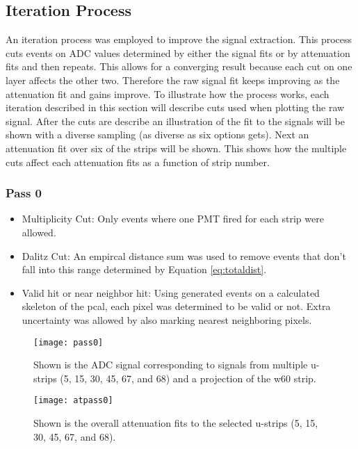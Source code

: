 \FloatBarrier
\subsection{Iteration Process}
An iteration process was employed to improve the signal extraction. This process cuts events on ADC values determined by either the signal fits or by attenuation fits and then repeats. This allows for a converging result because each cut on one layer affects the other two. Therefore the raw signal fit keeps improving as the attenuation fit and gains improve. To illustrate how the process works, each iteration described in this section will describe cuts used when plotting the raw signal. After the cuts are describe an illustration of the fit to the signals will be shown with a diverse sampling (as diverse as six options gets). Next an attenuation fit over six of the strips will be shown. This shows how the multiple cuts affect each attenuation fits as a function of strip number. 

\clearpage
\FloatBarrier
\subsubsection{Pass 0}
\begin{itemize}
    \item Multiplicity Cut: Only events where one PMT fired for each strip were allowed.
    \item Dalitz Cut: An empircal distance sum was used to remove events that don't fall into this range determined by Equation \ref{eq:totaldist}.
    \item Valid hit or near neighbor hit: Using generated events on a calculated skeleton of the pcal, each pixel was determined to be valid or not. Extra uncertainty was allowed by also marking nearest neighboring pixels.
\end{itemize}

\begin{figure}[h]
    \centering
    \texttt{[image: pass0]}
    \caption{Shown is the ADC signal corresponding to signals from multiple u-strips (5, 15, 30, 45, 67, and 68) and a projection of the w60 strip.}
    \label{fig:pass0}
\end{figure}

\begin{figure}[h]
    \centering
    \texttt{[image: atpass0]}
    \caption{Shown is the overall attenuation fits to the selected u-strips (5, 15, 30, 45, 67, and 68).}
    \label{fig:atpass0}
\end{figure}


